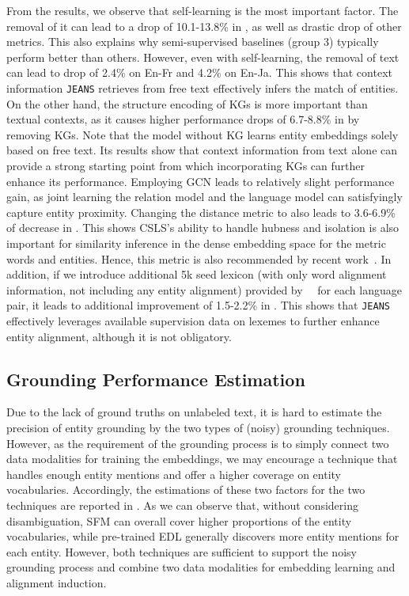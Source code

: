 \documentclass[11pt,a4paper]{article}
\newcommand{\modelname}[0]{\texttt{JEANS}\xspace}
\begin{document}
From the results, we observe that self-learning is the most important factor.
The removal of it can lead to a drop of 10.1-13.8\% in , as well as drastic drop of other metrics.
This also explains why semi-supervised baselines (group 3) typically perform better than others.
However, even with self-learning, the removal of text can lead to  drop of 2.4\% on En-Fr and 4.2\% on En-Ja.
This shows that context information \modelname retrieves from free text effectively infers the match of entities.
On the other hand, the structure encoding of KGs is more important than textual contexts,
as it causes higher performance drops of 6.7-8.8\% in  by removing KGs.
Note that the model without KG learns entity embeddings solely based on free text. Its results show that context information from text alone can provide a strong starting point from which incorporating KGs can further enhance its performance.
Employing GCN leads to relatively slight performance gain, as joint learning the relation model and the language model can satisfyingly capture entity proximity.
Changing the distance metric to  also leads to 3.6-6.9\% of decrease in .
This shows CSLS's ability to handle hubness and isolation is also important for similarity inference in the dense embedding space for the metric words and entities.
Hence, this metric is also recommended by recent work~\cite{sun2020alinet,sun2019transedge,zhang2019multi}. 
In addition, if we introduce additional 5k seed lexicon (with only word alignment information, not including any entity alignment) provided by~\citeauthor{conneau2018word}~ for each language pair, it leads to additional improvement of 1.5-2.2\% in .
This shows that \modelname effectively leverages available supervision data on lexemes to further enhance entity alignment, although it is not obligatory.





\subsection{Grounding Performance Estimation}\label{sup:grounding}



Due to the lack of ground truths on unlabeled text, it is hard to estimate the precision of entity grounding by the two types of (noisy) grounding techniques.
However, as the requirement of the grounding process is to simply connect two data modalities for training the embeddings, 
we may encourage a technique that handles enough entity mentions and offer a higher coverage on entity vocabularies.
Accordingly, the estimations of these two factors for the two techniques are reported in .
As we can observe that, without considering disambiguation, SFM can overall cover higher proportions of the entity vocabularies, while pre-trained EDL generally discovers more entity mentions for each entity.
However, both techniques are sufficient to support the noisy grounding process and combine two data modalities for embedding learning and alignment induction.
%
\end{document}
